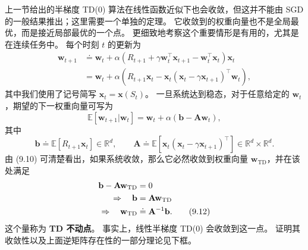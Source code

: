\documentclass[UTF8, 12pt, fontset=fandol, oneside]{ctexart}
\begin{document}
上一节给出的半梯度 TD(0) 算法在线性函数近似下也会收敛，但这并不能由 SGD 的一般结果推出；这里需要一个单独的定理。
它收敛到的权重向量也不是全局最优，而是接近局部最优的一个点。
更细致地考察这个重要情形是有用的，尤其是在连续任务中。
每个时刻 $t$ 的更新为
\begin{align}
\mathbf{w}_{t+1}
&\doteq \mathbf{w}_t+\alpha\left(R_{t+1}+\gamma\mathbf{w}_t^\top\mathbf{x}_{t+1}-\mathbf{w}_t^\top\mathbf{x}_t\right)\mathbf{x}_t \tag{9.9}\\
&= \mathbf{w}_t+\alpha\left(R_{t+1}\mathbf{x}_t-\mathbf{x}_t(\mathbf{x}_t-\gamma\mathbf{x}_{t+1})^\top\mathbf{w}_t\right),
\end{align}
其中我们使用了记号简写 $\mathbf{x}_t=\mathbf{x}(S_t)$。
一旦系统达到稳态，对于任意给定的 $\mathbf{w}_t$，期望的下一权重向量可写为
\begin{equation}
\mathbb{E}[\mathbf{w}_{t+1}|\mathbf{w}_t]
=\mathbf{w}_t+\alpha(\mathbf{b}-\mathbf{A}\mathbf{w}_t),
\tag{9.10}
\end{equation}
其中
\begin{equation}
\mathbf{b}\doteq \mathbb{E}[R_{t+1}\mathbf{x}_t]\in\mathbb{R}^d,
\qquad
\mathbf{A}\doteq \mathbb{E}\!\left[\mathbf{x}_t(\mathbf{x}_t-\gamma\mathbf{x}_{t+1})^\top\right]\in\mathbb{R}^d\times\mathbb{R}^d.
\tag{9.11}
\end{equation}
由 (9.10) 可清楚看出，如果系统收敛，那么它必然收敛到权重向量 $\mathbf{w}_{\mathrm{TD}}$，并在该处满足
\begin{align}
\mathbf{b}-\mathbf{A}\mathbf{w}_{\mathrm{TD}}&=0 \notag\\
\Rightarrow\quad \mathbf{b}&=\mathbf{A}\mathbf{w}_{\mathrm{TD}} \notag\\
\Rightarrow\quad \mathbf{w}_{\mathrm{TD}}&\doteq \mathbf{A}^{-1}\mathbf{b}.
\tag{9.12}
\end{align}
这个量称为 \textbf{TD 不动点}。
事实上，线性半梯度 TD(0) 会收敛到这一点。
证明其收敛性以及上面逆矩阵存在性的一部分理论见下框。
\end{document}
